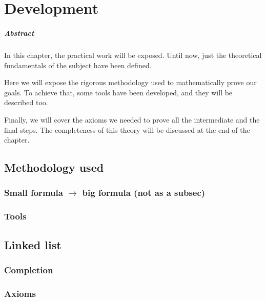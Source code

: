 \chapter{Development\label{sec:develpment}}

\paragraph{Abstract} In this chapter, the practical work will be exposed. Until now, just the theoretical fundamentals of the subject have been defined.

Here we will expose the rigorous methodology used to mathematically prove our goals. To achieve that, some tools have been developed, and they will be described too.

Finally, we will cover the axioms we needed to prove all the intermediate and the final steps. The completeness of this theory will be discussed at the end of the chapter. 

\section{Methodology used}

\subsection{Small formula $\rightarrow$ big formula (not as a subsec)}

\subsection{Tools}

\section{Linked list}

\subsection{Completion}
\subsection{Axioms}

